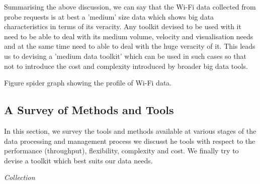 Summarising the above discussion, we can say that the Wi-Fi data collected from probe requests is at best a 'medium' size data which shows big data characteristics in terms of its veracity.
Any toolkit devised to be used with it need to be able to deal with its medium volume, velocity and visualisation needs and at the same time need to able to deal with the huge veracity of it.
This leads us to devising a 'medium data toolkit' which can be used in such cases so that not to introduce the cost and complexity introduced by broader big data tools.

Figure spider graph showing the profile of Wi-Fi data.


\subsection{A Survey of Methods and Tools}

In this section, we survey the tools and methods available at various stages of the data processing and management process we discusst he tools with respect to the performance (throughput), flexibility, complexity and cost.
We finally try to devise a toolkit which best suits our data needs.


\vspace{1.5em}\noindent\textit{Collection}\vspace{0.5em}

